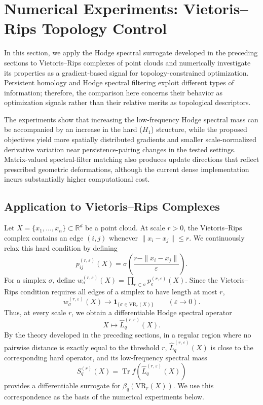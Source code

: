 \documentclass[pdflatex,sn-mathphys-num]{sn-jnl}%
\theoremstyle{thmstyleone}%
\theoremstyle{thmstyletwo}%
\theoremstyle{thmstylethree}%
\begin{document}
\section{Numerical Experiments: Vietoris--Rips Topology Control}
\label{sec:vr_experiments}

In this section, we apply the Hodge spectral surrogate developed in the preceding sections to Vietoris--Rips complexes of point clouds and numerically investigate its properties as a gradient-based signal for topology-constrained optimization.
Persistent homology and Hodge spectral filtering exploit different types of information; therefore, the comparison here concerns their behavior as optimization signals rather than their relative merits as topological descriptors.

The experiments show that increasing the low-frequency Hodge spectral mass can be accompanied by an increase in the hard ($H_1$) structure, while the proposed objectives yield more spatially distributed gradients and smaller scale-normalized derivative variation near persistence-pairing changes in the tested settings. Matrix-valued spectral-filter matching also produces update directions that reflect prescribed geometric deformations, although the current dense implementation incurs substantially higher computational cost.


\subsection{Application to Vietoris--Rips Complexes}

Let $X=\{x_1,\ldots,x_n\}\subset\mathbb R^d$
be a point cloud.
At scale \(r>0\), the Vietoris--Rips complex contains an edge \((i,j)\) whenever
$\|x_i-x_j\|\le r$.
We continuously relax this hard condition by defining
\[
p_{ij}^{(r,\varepsilon)}(X)
=
\sigma\left(
\frac{r-\|x_i-x_j\|}{\varepsilon}
\right).
\]
For a simplex \(\sigma\), define
$w_\sigma^{(r,\varepsilon)}(X)
=
\prod_{e\subset\sigma}
p_e^{(r,\varepsilon)}(X)$.
Since the Vietoris--Rips condition requires all edges of a simplex to have length at most \(r\),
\[
w_\sigma^{(r,\varepsilon)}(X)
\longrightarrow
\mathbf 1_{\{\sigma\in\mathrm{VR}_r(X)\}}
\qquad
(\varepsilon\to0).
\]
Thus, at every scale \(r\), we obtain a differentiable Hodge spectral operator
\[
X
\longmapsto
\widehat L_q^{(r,\varepsilon)}(X).
\]
By the theory developed in the preceding sections, in a regular region where no pairwise distance is exactly equal to the threshold \(r\),
\(\widehat L_q^{(r,\varepsilon)}(X)\) is close to the corresponding hard operator, and its low-frequency spectral mass
\[
S_q^{(r)}(X)
=
\operatorname{Tr}
f\left(
\widehat L_q^{(r,\varepsilon)}(X)
\right)
\]
provides a differentiable surrogate for
$\beta_q\left(\mathrm{VR}_r(X)\right)$.
We use this correspondence as the basis of the numerical experiments below.
\end{document}

